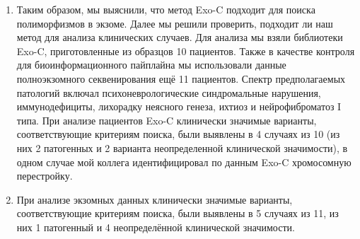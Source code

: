 \documentclass[a4paper,14pt]{extarticle}
\begin{document}
\begin{enumerate}
\item Таким образом, мы выяснили, что метод Exo-C подходит для поиска полиморфизмов в экзоме.
Далее мы решили проверить, подходит ли наш метод для анализа клинических случаев.
Для анализа мы взяли библиотеки Exo-C, приготовленные из образцов 10 пациентов.
Также в качестве контроля для биоинформационного пайплайна мы использовали данные полноэкзомного секвенирования ещё 11 пациентов.
Спектр предполагаемых патологий включал психоневрологические синдромальные нарушения, иммунодефициты, лихорадку неясного генеза, ихтиоз и нейрофиброматоз I типа.
При анализе пациентов Exo-C клинически значимые варианты, соответствующие критериям поиска, были выявлены в 4 случаях из 10 (из них 2 патогенных и 2 варианта неопределенной клинической значимости), в одном случае мой коллега идентифицировал по данным Exo-C хромосомную перестройку.

\item При анализе экзомных данных клинически значимые варианты, соответствующие критериям поиска, были выявлены в 5 случаях из 11, из них 1 патогенный и 4 неопределённой клинической значимости.
\end{enumerate}
\end{document}
